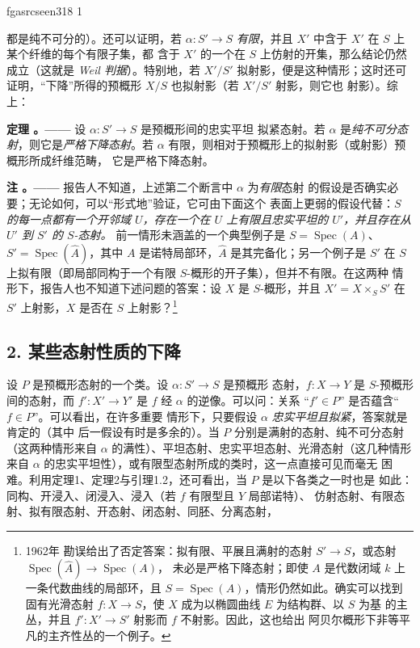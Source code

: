 \documentclass[12pt,twoside,openany]{book}
\numberwithin{equation}{section}
\newcommand{\fgaunitid}{unbound}
\newcommand{\src}[1]{%
  \phantomsection
  \hypertarget{src:\fgaunitid:#1}{}%
  \hypertarget{fga.\fgaunitid.p#1}{}%
  \ifcsname fgasrcseen#1\endcsname\else
    \expandafter\gdef\csname fgasrcseen#1\endcsname{1}%
    \hypertarget{src:#1}{}%
  \fi
  \marginpar{\raggedleft\footnotesize\sffamily #1}%
}
\newcommand{\fquote}[1]{“#1”}
\theoremstyle{plain}
\theoremstyle{definition}
\theoremstyle{remark}
\newcommand{\result}[2]{%
  \par\medskip\noindent\textbf{#1%
  \if\relax\detokenize{#2}\relax\else\space#2\fi。——}\enspace
}
\begin{document}
\src{318}
都是纯不可分的）。还可以证明，若 $\alpha:S'\longrightarrow S$
\emph{有限}，并且 $X'$ 中含于 $X'$ 在 $S$ 上某个纤维的每个有限子集，都
含于 $X'$ 的一个在 $S$ 上仿射的开集，那么结论仍然成立（这就是
\emph{Weil 判据}）。特别地，若 $X'/S'$ 拟射影，便是这种情形；这时还可
证明，\fquote{下降}所得的预概形 $X/S$ 也拟射影（若 $X'/S'$ 射影，则它也
射影）。综上：

\result{定理}{3} 设 $\alpha:S'\longrightarrow S$ 是预概形间的忠实平坦
拟紧态射。若 $\alpha$ 是\emph{纯不可分态射}，则它是\emph{严格下降态射}。若
$\alpha$ 有限，则相对于预概形上的拟射影（或射影）预概形所成纤维范畴，
它是严格下降态射。

\result{注}{} 报告人不知道，上述第二个断言中 $\alpha$ 为\emph{有限}态射
的假设是否确实必要；无论如何，可以\fquote{形式地}验证，它可由下面这个
表面上更弱的假设代替：\emph{$S$ 的每一点都有一个开邻域 $U$，存在一个在
$U$ 上有限且忠实平坦的 $U'$，并且存在从 $U'$ 到 $S'$ 的 $S$-态射。}
前一情形未涵盖的一个典型例子是
$S=\operatorname{Spec}(A)$、$S'=\operatorname{Spec}(\widehat A)$，其中
$A$ 是诺特局部环，$\widehat A$ 是其完备化；另一个例子是 $S'$ 在 $S$
上拟有限（即局部同构于一个有限 $S$-概形的开子集），但并不有限。在这两种
情形下，报告人也不知道下述问题的答案：设 $X$ 是 $S$-概形，并且
$X'=X\times_SS'$ 在 $S'$ 上射影，$X$ 是否在 $S$ 上射影？\footnote{1962年
勘误给出了否定答案：拟有限、平展且满射的态射
$S'\longrightarrow S$，或态射
$\operatorname{Spec}(\widehat A)\longrightarrow\operatorname{Spec}(A)$，
未必是严格下降态射；即使 $A$ 是代数闭域 $k$ 上一条代数曲线的局部环，且
$S=\operatorname{Spec}(A)$，情形仍然如此。确实可以找到固有光滑态射
$f:X\longrightarrow S$，使 $X$ 成为以椭圆曲线 $E$ 为结构群、以 $S$ 为基
的主丛，并且 $f':X'\longrightarrow S'$ 射影而 $f$ 不射影。因此，这也给出
阿贝尔概形下非等平凡的主齐性丛的一个例子。}

\subsection*{2. 某些态射性质的下降}

设 $P$ 是预概形态射的一个类。设 $\alpha:S'\longrightarrow S$ 是预概形
态射，$f:X\longrightarrow Y$ 是 $S$-预概形间的态射，而
$f':X'\longrightarrow Y'$ 是 $f$ 经 $\alpha$ 的逆像。可以问：关系
\fquote{$f'\in P$} 是否蕴含\fquote{$f\in P$}。可以看出，在许多重要
情形下，只要假设 $\alpha$ \emph{忠实平坦且拟紧}，答案就是肯定的（其中
后一假设有时是多余的）。当 $P$ 分别是满射的态射、纯不可分态射（这两种情形来自
$\alpha$ 的满性）、平坦态射、忠实平坦态射、光滑态射（这几种情形来自
$\alpha$ 的忠实平坦性），或有限型态射所成的类时，这一点直接可见而毫无
困难。利用定理1、定理2与引理1.2，还可看出，当 $P$ 是以下各类之一时也是
如此：同构、开浸入、闭浸入、浸入（若 $f$ 有限型且 $Y$ 局部诺特）、
仿射态射、有限态射、拟有限态射、开态射、闭态射、同胚、分离态射，
\end{document}
